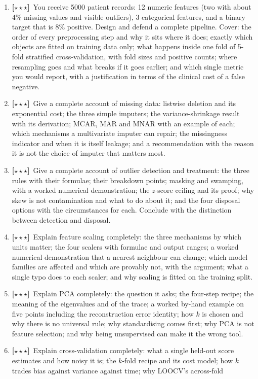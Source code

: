 \documentclass[11pt,a4paper]{article}
\newcommand{\LA}{{\footnotesize\textbf{[$\star\star\star$]}}}
\newcommand{\Q}[1]{\item[\textbf{#1}]}
\begin{document}
\begin{enumerate}[leftmargin=2.2cm]
\Q{U4.77}\LA\ You receive 5000 patient records: 12 numeric features (two with
  about 4\% missing values and visible outliers), 3 categorical features, and a
  binary target that is 8\% positive. Design and defend a complete pipeline.
  Cover: the order of every preprocessing step and why it sits where it does;
  exactly which objects are fitted on training data only; what happens inside
  one fold of 5-fold stratified cross-validation, with fold sizes and positive
  counts; where resampling goes and what breaks if it goes earlier; and which
  single metric you would report, with a justification in terms of the clinical
  cost of a false negative.
\Q{U4.78}\LA\ Give a complete account of missing data: listwise deletion and
  its exponential cost; the three simple imputers; the variance-shrinkage
  result with its derivation; MCAR, MAR and MNAR with an example of each; which
  mechanisms a multivariate imputer can repair; the missingness indicator and
  when it is itself leakage; and a recommendation with the reason it is not the
  choice of imputer that matters most.
\Q{U4.79}\LA\ Give a complete account of outlier detection and treatment: the
  three rules with their formulae; their breakdown points; masking and
  swamping, with a worked numerical demonstration; the $z$-score ceiling and
  its proof; why skew is not contamination and what to do about it; and the
  four disposal options with the circumstances for each. Conclude with the
  distinction between detection and disposal.
\Q{U4.80}\LA\ Explain feature scaling completely: the three mechanisms by which
  units matter; the four scalers with formulae and output ranges; a worked
  numerical demonstration that a nearest neighbour can change; which model
  families are affected and which are provably not, with the argument; what a
  single typo does to each scaler; and why scaling is fitted on the training
  split.
\Q{U4.81}\LA\ Explain PCA completely: the question it asks; the four-step
  recipe; the meaning of the eigenvalues and of the trace; a worked
  by-hand example on five points including the reconstruction error identity;
  how $k$ is chosen and why there is no universal rule; why standardising comes
  first; why PCA is not feature selection; and why being unsupervised can make
  it the wrong tool.
\Q{U4.82}\LA\ Explain cross-validation completely: what a single held-out score
  estimates and how noisy it is; the $k$-fold recipe and its cost model; how
  $k$ trades bias against variance against time; why LOOCV's across-fold

\end{enumerate}
\end{document}

